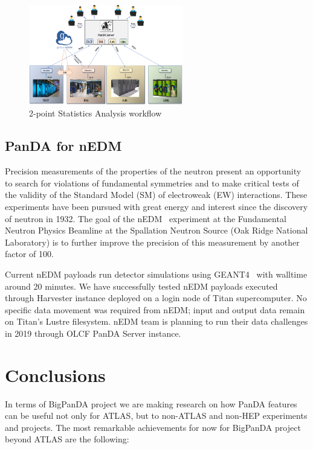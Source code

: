 \documentclass{webofc}
\begin{document}
\begin{figure}
	\centering
	\includegraphics[width=0.60\textwidth]{figures/LQCD_future_environment.png}
	\caption{2-point Statistics Analysis workflow}
	\label{fig:lqcd_env}
\end{figure}


\subsection{PanDA for nEDM} \label{section_nedm}

Precision measurements of the properties of the neutron present an opportunity to search for violations of fundamental symmetries and to make critical tests of the validity of the Standard Model (SM) of electroweak (EW) interactions. These experiments have been pursued with great energy and interest since the discovery of neutron in 1932.  The goal of the nEDM~\cite{Lamoreaux_2009} experiment at the Fundamental Neutron Physics Beamline at the Spallation Neutron Source (Oak Ridge National Laboratory) is to further improve the precision of this measurement by another factor of 100.

Current nEDM payloads run detector simulations using GEANT4~\cite{AGOSTINELLI2003250} with walltime around 20 minutes. We have successfully tested nEDM payloads executed through Harvester instance deployed on a login node of Titan supercomputer. No specific data movement was required from nEDM; input and output data remain on Titan’s Lustre filesystem. nEDM team is planning to run their data challenges in 2019 through OLCF PanDA Server instance.


\section{Conclusions}

In terms of BigPanDA project we are making research on how PanDA features can be useful not only for ATLAS, but to non-ATLAS and non-HEP experiments and projects.
The most remarkable achievements for now for BigPanDA project beyond ATLAS are the following:
\end{document}
